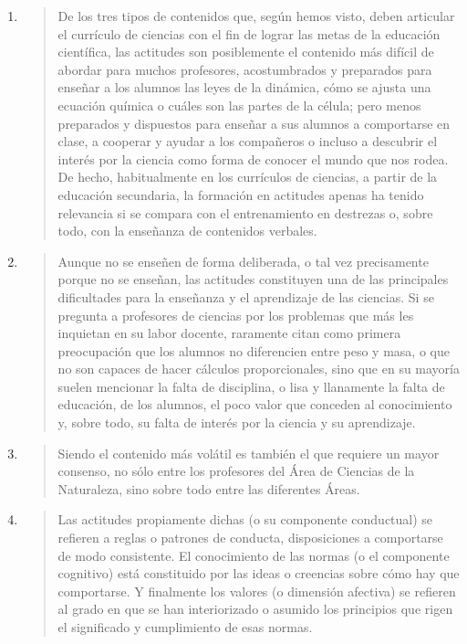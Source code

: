 \documentclass{article}
\begin{document}
\tableofcontents  \vspace{2cm}

\begin{enumerate}
  \item \begin{quote}
  De los tres tipos de contenidos que, según hemos visto, deben articular el currículo de ciencias con el fin de lograr las metas de la educación científica, las actitudes son posiblemente el contenido más difícil de abordar para muchos profesores, acostumbrados y preparados para enseñar a los alumnos las leyes de la dinámica, cómo se ajusta una ecuación química o cuáles son las partes de la célula; pero menos preparados y dispuestos para enseñar a sus alumnos a comportarse en clase, a cooperar y ayudar a los compañeros o incluso a descubrir el interés por la ciencia como forma de conocer el mundo que nos rodea. De hecho, habitualmente en los currículos de ciencias, a partir de la educación secundaria, la formación en actitudes apenas ha tenido relevancia si se compara con el entrenamiento en destrezas o, sobre todo, con la enseñanza de contenidos verbales. 
  \end{quote}

  \item \begin{quote}
  Aunque no se enseñen de forma deliberada, o tal vez precisamente porque no se enseñan, las actitudes constituyen una de las principales dificultades para la enseñanza y el aprendizaje de las ciencias. Si se pregunta a profesores de ciencias por los problemas que más les inquietan en su labor docente, raramente citan como primera preocupación que los alumnos no diferencien entre peso y masa, o que no son capaces de hacer cálculos proporcionales, sino que en su mayoría suelen mencionar la falta de disciplina, o lisa y llanamente la falta de educación, de los alumnos, el poco valor que conceden al conocimiento y, sobre todo, su falta de interés por la ciencia y su aprendizaje.
  \end{quote}

  \item \begin{quote}
  Siendo el contenido más volátil es también el que requiere un mayor consenso, no sólo entre los profesores del Área de Ciencias de la Naturaleza, sino sobre todo entre las diferentes Áreas.
  \end{quote}

  \item \begin{quote}
  Las actitudes propiamente dichas (o su componente conductual) se refieren a reglas o patrones de conducta, disposiciones a comportarse de modo consistente. El conocimiento de las normas (o el componente cognitivo) está constituido por las ideas o creencias sobre cómo hay que comportarse. Y finalmente los valores (o dimensión afectiva) se refieren al grado en que se han interiorizado o asumido los principios que rigen el significado y cumplimiento de esas normas.
  \end{quote}


\end{enumerate}
\end{document}
